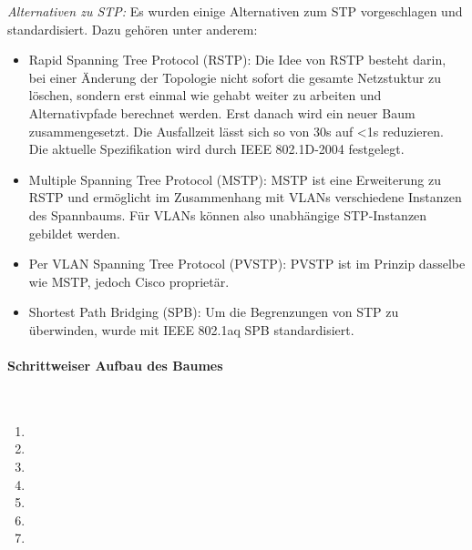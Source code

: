 {\it Alternativen zu STP:} Es wurden einige Alternativen zum STP vorgeschlagen und standardisiert. Dazu gehören unter anderem:
\begin{itemize}
	\item Rapid Spanning Tree Protocol (RSTP): Die Idee von RSTP besteht darin, bei einer Änderung der Topologie nicht sofort die gesamte Netzstuktur zu löschen, sondern erst einmal wie gehabt weiter zu arbeiten und Alternativpfade berechnet werden. Erst danach wird ein neuer Baum zusammengesetzt. Die Ausfallzeit lässt sich so von 30s auf <1s reduzieren. Die aktuelle Spezifikation wird durch IEEE 802.1D-2004 festgelegt.
    \item Multiple Spanning Tree Protocol (MSTP): MSTP ist eine Erweiterung zu RSTP und ermöglicht im Zusammenhang mit VLANs verschiedene Instanzen des Spannbaums. Für VLANs können also unabhängige STP-Instanzen gebildet werden.
    \item Per VLAN Spanning Tree Protocol (PVSTP): PVSTP ist im Prinzip dasselbe wie MSTP, jedoch Cisco
proprietär.
    \item Shortest Path Bridging (SPB): Um die Begrenzungen von STP zu überwinden, wurde mit IEEE 802.1aq SPB 
standardisiert.
\end{itemize}

\paragraph{Schrittweiser Aufbau des Baumes}~\\	

\begin{enumerate}
	\item 
	\item 
	\item 
	\item 
	\item 
	\item 
	\item 
\end{enumerate}
